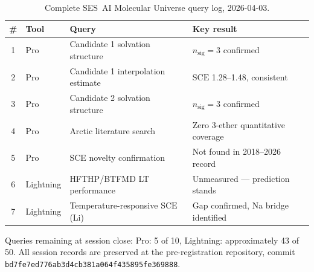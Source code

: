 \documentclass[12pt,letterpaper]{article}
\newcommand{\mSCE}{\mathrm{SCE}}
\begin{document}
\begin{table}[h!]
\centering
\caption{Complete SES~AI Molecular Universe query log,
2026-04-03.}
\label{tab:mu}
\begin{tabularx}{\textwidth}{clXl}
\toprule
\# & Tool & Query & Key result \\
\midrule
1 & Pro
  & Candidate 1 solvation structure
  & $n_{\mathrm{sig}} = 3$ confirmed \\
2 & Pro
  & Candidate 1 interpolation estimate
  & $\mSCE$ 1.28--1.48, consistent \\
3 & Pro
  & Candidate 2 solvation structure
  & $n_{\mathrm{sig}} = 3$ confirmed \\
4 & Pro
  & Arctic literature search
  & Zero 3-ether quantitative coverage \\
5 & Pro
  & SCE novelty confirmation
  & Not found in 2018--2026 record \\
6 & Lightning
  & HFTHP/BTFMD LT performance
  & Unmeasured --- prediction stands \\
7 & Lightning
  & Temperature-responsive $\mSCE$ (Li)
  & Gap confirmed, Na bridge identified \\
\bottomrule
\end{tabularx}
\end{table}

\noindent Queries remaining at session close:
Pro: 5 of 10, Lightning: approximately 43 of 50.
All session records are preserved at the
pre-registration repository,
commit \texttt{bd7fe7ed776ab3d4cb381a064f435895fe369888}.

\end{document}
